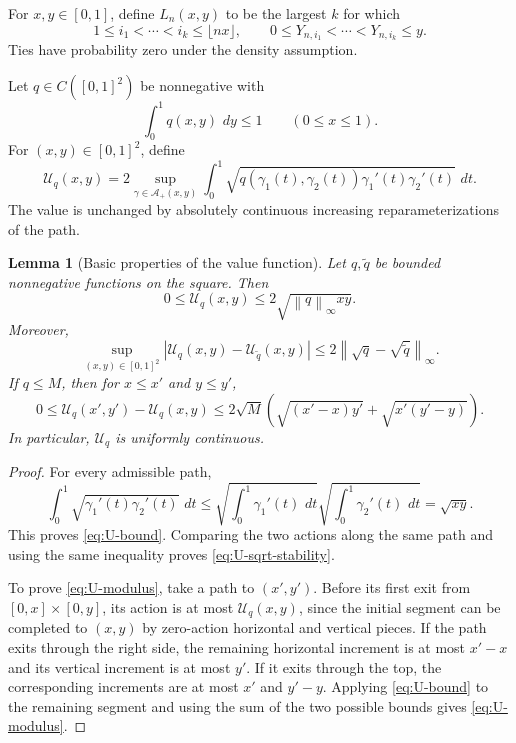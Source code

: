 \documentclass[11pt]{article}
\newtheorem{lemma}[theorem]{Lemma}
\theoremstyle{remark}
\newcommand{\dd}{\,d}
\newcommand{\calA}{\mathcal A}
\newcommand{\calU}{\mathcal U}
\newcommand{\norm}[1]{\left\lVert #1\right\rVert}
\begin{document}
For $x,y\in[0,1]$, define $L_n(x,y)$ to be the largest $k$ for which
\[
        1\le i_1<\cdots<i_k\le\lfloor nx\rfloor,
        \qquad
        0\le Y_{n,i_1}<\cdots<Y_{n,i_k}\le y.
\]
Ties have probability zero under the density assumption.

Let $q\in C([0,1]^2)$ be nonnegative with
\begin{equation}\label{eq:q-row-mass}
        \int_0^1q(x,y)\,\dd y\le1
        \qquad (0\le x\le1).
\end{equation}
For $(x,y)\in[0,1]^2$, define
\begin{equation}\label{eq:Uq-def}
 \calU_q(x,y)=
 2\sup_{\gamma\in\calA_+(x,y)}
 \int_0^1
 \sqrt{q(\gamma_1(t),\gamma_2(t))
       \gamma_1'(t)\gamma_2'(t)}\,\dd t.
\end{equation}
The value is unchanged by absolutely continuous increasing
reparameterizations of the path.

\begin{lemma}[Basic properties of the value function]\label{lem:U-basic}
Let $q,\widetilde q$ be bounded nonnegative functions on the square.
Then
\begin{equation}\label{eq:U-bound}
        0\le\calU_q(x,y)\le2\sqrt{\norm q_\infty xy}.
\end{equation}
Moreover,
\begin{equation}\label{eq:U-sqrt-stability}
 \sup_{(x,y)\in[0,1]^2}
 |\calU_q(x,y)-\calU_{\widetilde q}(x,y)|
 \le2\norm{\sqrt q-\sqrt{\widetilde q}}_\infty.
\end{equation}
If $q\le M$, then for $x\le x'$ and $y\le y'$,
\begin{equation}\label{eq:U-modulus}
 0\le\calU_q(x',y')-\calU_q(x,y)
 \le2\sqrt M\left(
       \sqrt{(x'-x)y'}+\sqrt{x'(y'-y)}\right).
\end{equation}
In particular, $\calU_q$ is uniformly continuous.
\end{lemma}

\begin{proof}
For every admissible path,
\[
 \int_0^1\sqrt{\gamma_1'(t)\gamma_2'(t)}\,\dd t
 \le\sqrt{\int_0^1\gamma_1'(t)\,\dd t}
      \sqrt{\int_0^1\gamma_2'(t)\,\dd t}
 =\sqrt{xy}.
\]
This proves \eqref{eq:U-bound}.  Comparing the two actions along the same path
and using the same inequality proves \eqref{eq:U-sqrt-stability}.

To prove \eqref{eq:U-modulus}, take a path to $(x',y')$.  Before its first
exit from $[0,x]\times[0,y]$, its action is at most $\calU_q(x,y)$, since the
initial segment can be completed to $(x,y)$ by zero-action horizontal and
vertical pieces.  If the path exits through the right side, the remaining
horizontal increment is at most $x'-x$ and its vertical increment is at most
$y'$.  If it exits through the top, the corresponding increments are at most
$x'$ and $y'-y$.  Applying \eqref{eq:U-bound} to the remaining segment and
using the sum of the two possible bounds gives \eqref{eq:U-modulus}.
\end{proof}
\end{document}
